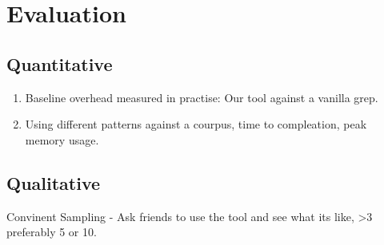 
\section{Evaluation}
\label{sec:evaluation}
\subsection{Quantitative}
\begin{enumerate}
	\item Baseline overhead measured in practise: Our tool against a vanilla grep.
	\item Using different patterns against a courpus, time to compleation, peak memory usage.
\end{enumerate}
\subsection{Qualitative}
Convinent Sampling - Ask friends to use the tool and see what its like, >3 preferably 5 or 10.

